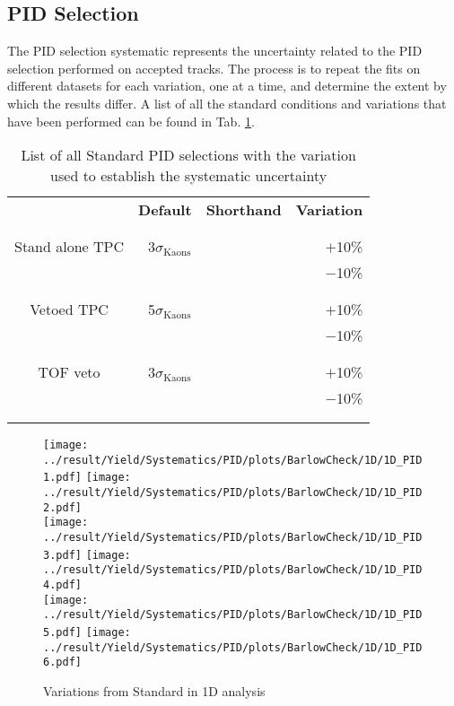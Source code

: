 \newpage
\subsection{PID Selection}
The PID selection systematic represents the uncertainty related to the PID selection performed on accepted tracks. The process is to repeat the fits on different datasets for each variation, one at a time, and determine the extent by which the results differ. A list of all the standard conditions and variations that have been performed can be found in Tab. \ref{tab:Syst_PID}.
\begin{table}
\center
\begin{tabular}{c|r|r|r}
					&\textbf{Default}							&\textbf{Shorthand}			&\textbf{Variation}		\\
					\\ \hline \\
Stand alone TPC		&3$\sigma_{\text{Kaons}}$					&\texttt{\blue{PID1}}			&$+$10\%\\
					&										&\texttt{\blue{PID2}}			&$-$10\%\\
					\\ \hline \\
Vetoed TPC			&5$\sigma_{\text{Kaons}}$					&\texttt{\blue{PID3}}			&$+$10\%\\
					&										&\texttt{\blue{PID4}}			&$-$10\%\\
					\\ \hline \\
TOF veto				&3$\sigma_{\text{Kaons}}$					&\texttt{\blue{PID5}}			&$+$10\%\\
					&										&\texttt{\blue{PID6}}			&$-$10\%\\
					\\ \hline \\

\end{tabular}
\caption{List of all Standard PID selections with the variation used to establish the systematic uncertainty}
\label{tab:Syst_PID}
\end{table}

\newpage
\begin{figure}
	\centering
		\texttt{[image: ../result/Yield/Systematics/PID/plots/BarlowCheck/1D/1D\_PID1.pdf]}
		\texttt{[image: ../result/Yield/Systematics/PID/plots/BarlowCheck/1D/1D\_PID2.pdf]}\\
		\texttt{[image: ../result/Yield/Systematics/PID/plots/BarlowCheck/1D/1D\_PID3.pdf]}
		\texttt{[image: ../result/Yield/Systematics/PID/plots/BarlowCheck/1D/1D\_PID4.pdf]}\\
		\texttt{[image: ../result/Yield/Systematics/PID/plots/BarlowCheck/1D/1D\_PID5.pdf]}
		\texttt{[image: ../result/Yield/Systematics/PID/plots/BarlowCheck/1D/1D\_PID6.pdf]}\\
		\caption{Variations from Standard in 1D analysis}
		\label{}
\end{figure}

